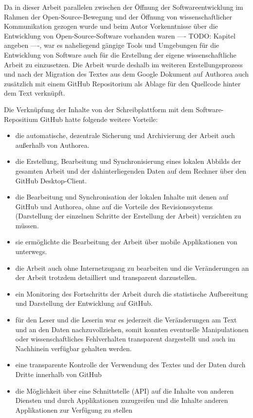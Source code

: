 Da in dieser Arbeit parallelen zwischen der Öffnung der Softwareentwicklung im Rahmen der Open-Source-Bewegung und der Öffnung von wissenschaftlicher Kommunikation gezogen wurde und beim Autor Vorkenntnisse über die Entwicklung von Open-Source-Software vorhanden waren ---- TODO: Kapitel angeben ----, war es naheliegend gängige Tools und Umgebungen für die Entwicklung von Software auch für die Erstellung der eigene wissenschaftliche Arbeit zu einzusetzen. Die Arbeit wurde deshalb im weiteren Erstellungsprozess und nach der Migration des Textes aus dem Google Dokument auf Authorea auch zusätzlich mit einem GitHub Repositorium als Ablage für den Quellcode hinter dem Text verknüpft.

Die Verknüpfung der Inhalte von der Schreibplattform mit dem Software-Repositium GitHub hatte folgende weitere Vorteile:
\begin{itemize}
\item die automatische, dezentrale Sicherung und Archivierung der Arbeit auch außerhalb von Authorea.
\item die Erstellung, Bearbeitung und Synchronisierung eines lokalen Abbilds der gesamten Arbeit und der dahinterliegenden Daten auf dem Rechner über den GitHub Desktop-Client.
\item die Bearbeitung und Synchronisation der lokalen Inhalte mit denen auf GitHub und Authorea, ohne auf die Vorteile des Revisionssystems (Darstellung der einzelnen Schritte der Erstellung der Arbeit) verzichten zu müssen.
\item sie ermöglichte die Bearbeitung der Arbeit über mobile Applikationen von unterwegs.
\item die Arbeit auch ohne Internetzugang zu bearbeiten und die Veränderungen an der Arbeit trotzdem detailliert und transparent darzustellen.
\item ein Monitoring des Fortschritts der Arbeit durch die statistische Aufbereitung und Darstellung der Entwicklung auf GitHub.
\item für den Leser und die Leserin war es jederzeit die Veränderungen am Text und an den Daten nachzuvollziehen, somit konnten eventuelle Manipulationen oder wissenschaftliches Fehlverhalten transparent dargestellt und auch im Nachhinein verfügbar gehalten werden.
\item eine transparente Kontrolle der Verwendung des Textes und der Daten durch Dritte innerhalb von GitHub
\item die Möglichkeit über eine Schnittstelle (API) auf die Inhalte von anderen Diensten und durch Applikationen zuzugreifen und die Inhalte anderen Applikationen zur Verfügung zu stellen
\end{itemize}

